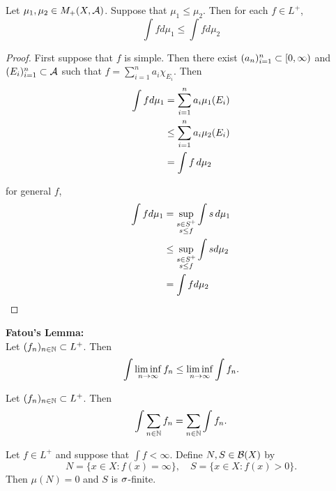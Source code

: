 \documentclass{book}
\begin{document}
	
	\begin{ex} 
		Let $\mu_1, \mu_2 \in M_+(X,\mathcal{A})$. Suppose that $\mu_1 \leq \mu_2$. Then for each $f \in L^+$, $$\int f d\mu_1 \leq \int f d\mu_2$$
	\end{ex}
	
	\begin{proof}
		First suppose that $f$ is simple. Then there exist $(a_n)_{i=1}^n \subset [0,\infty)$ and $(E_i)_{i=1}^n \subset \mathcal{A}$ such that $f = \sum\limits_{i =1}^n a_i \chi_{E_i}$. Then 
		\begin{align*}
			\int f d\mu_1 
			&= \sum\limits_{i =1}^n a_i \mu_1(E_i)\\
			& \leq \sum\limits_{i =1}^n a_i \mu_2(E_i)\\
			&= \int f \, d \mu_2
		\end{align*} 
		
		for general $f$, 
		\begin{align*}
			\int f d\mu_1 
			&= \sup_{\substack{s \in S^+\\s \leq f}} \int s \, d \mu_1 \\
			& \leq \sup_{\substack{s \in S^+\\s \leq f}} \int s d\mu_2\\
			&= \int f d\mu_2
		\end{align*}
		
	\end{proof}
	
	\begin{thm}  \textbf{Fatou's Lemma:}\\
		Let $(f_n)_{n \in \mathbb{N}} \subset L^+$. Then 
		$$\int \liminf \limits_{n \rightarrow \infty} f_n \leq \liminf \limits_{n \rightarrow \infty} \int f_n.$$
	\end{thm}
	
	\begin{thm} 
		Let $(f_n)_{n \in \mathbb{N}} \subset L^+$. Then 
		$$\int \sum_{n \in \mathbb{N}} f_n= \sum_{n \in \mathbb{N}} \int f_n.$$
	\end{thm}
	
	\begin{ex} 
		Let $f \in L^+$ and suppose that $\int f < \infty$. Define $N, S \in \mathcal{B}(X)$ by 
		$$N = \{x \in X: f(x) = \infty\}, \quad S = \{x \in X: f(x) > 0\}.$$ 
		Then $\mu(N) = 0$ and $S$ is $\sigma$-finite.
	\end{ex}
	
\end{document}
